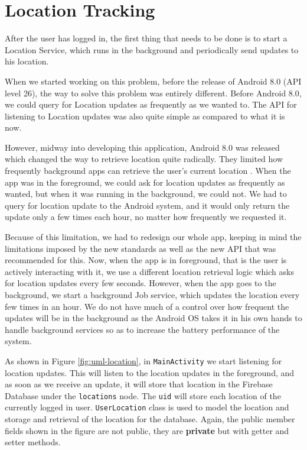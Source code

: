 \section{Location Tracking}
After the user has logged in, the first thing that needs to be done is to start a Location Service, which runs in the background and periodically send updates to his location.

When we started working on this problem, before the release of Android 8.0 (API level 26), the way to solve this problem was entirely different. Before Android 8.0, we could query for Location updates as frequently as we wanted to. The API for listening to Location updates was also quite simple as compared to what it is now. 

However, midway into developing this application, Android 8.0 was released which changed the way to retrieve location quite radically. They limited how frequently background apps can retrieve the user's current location \cite{GoogleLocationLimits2018}. When the app was in the foreground, we could ask for location updates as frequently as wanted, but when it was running in the background, we could not. We had to query for location update to the Android system, and it would only return the update only a few times each hour, no matter how frequently we requested it.

Because of this limitation, we had to redesign our whole app, keeping in mind the limitations imposed by the new standards as well as the new API that was recommended for this. Now, when the app is in foreground, that is the user is actively interacting with it, we use a different location retrieval logic which asks for location updates every few seconds. However, when the app goes to the background, we start a background Job service, which updates the location every few times in an hour. We do not have much of a control over how frequent the updates will be in the background as the Android OS takes it in his own hands to handle background services so as to increase the battery performance of the system.

As shown in Figure \ref{fig:uml-location}, in \texttt{MainActivity} we start listening for location updates. This will listen to the location updates in the foreground, and as soon as we receive an update, it will store that location in the Firebase Database under the \texttt{locations} node. The \texttt{uid} will store each location of the currently logged in user. \texttt{UserLocation} class is used to model the location and storage and retrieval of the location for the database. Again, the public member fields shown in the figure are not public, they are \textbf{private} but with getter and setter methods.

